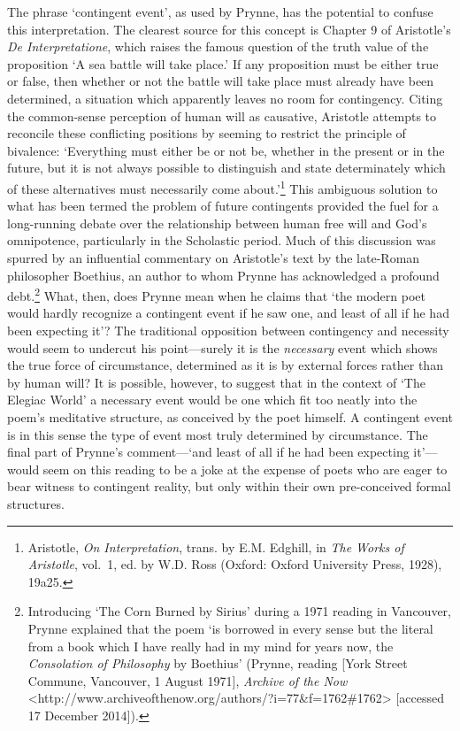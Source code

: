 \documentclass[]{article}
\begin{document}
The phrase `contingent event', as used by Prynne, has the potential to
confuse this interpretation. The clearest source for this concept is
Chapter 9 of Aristotle's \emph{De Interpretatione}, which raises the
famous question of the truth value of the proposition `A sea battle will
take place.' If any proposition must be either true or false, then
whether or not the battle will take place must already have been
determined, a situation which apparently leaves no room for contingency.
Citing the common-sense perception of human will as causative, Aristotle
attempts to reconcile these conflicting positions by seeming to restrict
the principle of bivalence: `Everything must either be or not be,
whether in the present or in the future, but it is not always possible
to distinguish and state determinately which of these alternatives must
necessarily come about.'\footnote{Aristotle, \emph{On Interpretation},
  trans. by E.M. Edghill, in \emph{The Works of Aristotle}, vol.~1, ed.
  by W.D. Ross (Oxford: Oxford University Press, 1928), 19a25.} This
ambiguous solution to what has been termed the problem of future
contingents provided the fuel for a long-running debate over the
relationship between human free will and God's omnipotence, particularly
in the Scholastic period. Much of this discussion was spurred by an
influential commentary on Aristotle's text by the late-Roman philosopher
Boethius, an author to whom Prynne has acknowledged a profound
debt.\footnote{Introducing `The Corn Burned by Sirius' during a 1971
  reading in Vancouver, Prynne explained that the poem `is borrowed in
  every sense but the literal from a book which I have really had in my
  mind for years now, the \emph{Consolation of Philosophy} by Boethius'
  (Prynne, reading {[}York Street Commune, Vancouver, 1 August 1971{]},
  \emph{Archive of the Now}
  \textless{}http://www.archiveofthenow.org/authors/?i=77\&f=1762\#1762\textgreater{}
  {[}accessed 17 December 2014{]}).} What, then, does Prynne mean when
he claims that `the modern poet would hardly recognize a contingent
event if he saw one, and least of all if he had been expecting it'? The
traditional opposition between contingency and necessity would seem to
undercut his point---surely it is the \emph{necessary} event which shows
the true force of circumstance, determined as it is by external forces
rather than by human will? It is possible, however, to suggest that in
the context of `The Elegiac World' a necessary event would be one which
fit too neatly into the poem's meditative structure, as conceived by the
poet himself. A contingent event is in this sense the type of event most
truly determined by circumstance. The final part of Prynne's
comment---`and least of all if he had been expecting it'---would seem on
this reading to be a joke at the expense of poets who are eager to bear
witness to contingent reality, but only within their own pre-conceived
formal structures.
\end{document}

